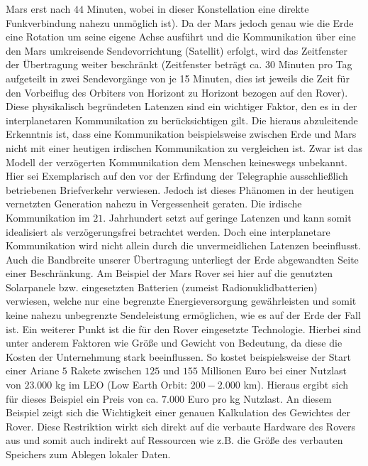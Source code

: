 Mars erst nach $44$ Minuten, wobei in dieser Konstellation eine direkte
Funkverbindung nahezu unm{\"o}glich ist).
Da der Mars jedoch genau wie die Erde eine Rotation um seine eigene Achse
ausf{\"u}hrt und die Kommunikation {\"u}ber eine den Mars
umkreisende Sendevorrichtung (Satellit) erfolgt, wird das Zeitfenster der
{\"U}bertragung weiter beschr{\"a}nkt (Zeitfenster betr{\"a}gt ca. 30 Minuten
pro Tag aufgeteilt in zwei Sendevorg{\"a}nge von je 15 Minuten, dies ist jeweils
die Zeit f{\"u}r den Vorbeiflug des Orbiters von Horizont zu Horizont bezogen
auf den Rover).
Diese physikalisch begr{\"u}ndeten Latenzen sind ein wichtiger Faktor, den es in
der interplanetaren Kommunikation zu ber{\"u}cksichtigen gilt. Die hieraus
abzuleitende Erkenntnis ist, dass eine Kommunikation beispielsweise zwischen
Erde und Mars nicht mit einer heutigen irdischen Kommunikation zu vergleichen
ist. Zwar ist das Modell der verz{\"o}gerten Kommunikation dem Menschen
keineswegs unbekannt.
Hier sei Exemplarisch auf den vor der Erfindung der Telegraphie
ausschlie{\ss}lich betriebenen Briefverkehr verwiesen. Jedoch ist dieses
Ph{\"a}nomen in der heutigen vernetzten Generation nahezu in Vergessenheit
geraten. Die irdische Kommunikation im $21$. Jahrhundert setzt auf geringe
Latenzen und kann somit idealisiert als verz{\"o}gerungsfrei betrachtet werden.
Doch eine interplanetare Kommunikation wird nicht allein durch die
unvermeidlichen Latenzen beeinflusst. Auch die Bandbreite unserer
{\"U}bertragung unterliegt der Erde abgewandten Seite einer Beschr{\"a}nkung. Am
Beispiel der Mars Rover sei hier auf die genutzten Solarpanele bzw. eingesetzten
Batterien (zumeist Radionuklidbatterien) verwiesen, welche nur eine begrenzte
Energieversorgung gew{\"a}hrleisten und somit keine nahezu unbegrenzte
Sendeleistung erm{\"o}glichen, wie es auf der Erde der Fall ist.
Ein weiterer Punkt ist die f{\"u}r den Rover eingesetzte Technologie. Hierbei 
sind unter anderem Faktoren wie Gr{\"o}{\ss}e und Gewicht von Bedeutung, da 
diese die Kosten der Unternehmung stark beeinflussen. So kostet beispielsweise 
der Start einer Ariane $5$ Rakete zwischen $125$ und $155$ Millionen Euro bei 
einer Nutzlast von $23.000$ kg im LEO (Low Earth Orbit: $200-2.000$ km).
Hieraus ergibt sich f{\"u}r dieses Beispiel ein Preis von ca. $7.000$ Euro pro kg 
Nutzlast. An diesem Beispiel zeigt sich die Wichtigkeit einer genauen
Kalkulation des Gewichtes der Rover. Diese Restriktion wirkt sich direkt auf die
verbaute Hardware des Rovers aus und somit auch indirekt auf Ressourcen wie z.B.
die Gr{\"o}{\ss}e des verbauten Speichers zum Ablegen lokaler Daten.
